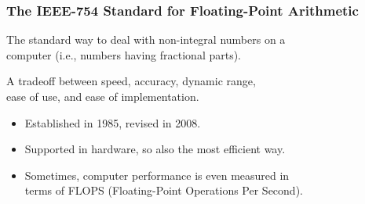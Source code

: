 \begin{frame}

\frametitle{The IEEE-754 Standard for Floating-Point Arithmetic}

\vspace{\fill}

\begin{center}

The standard way to deal with non-integral numbers on a \\ computer (i.e.,
numbers having fractional parts).

\vspace{\fill}

A tradeoff between speed, accuracy, dynamic range, \\ ease of use, and ease of
implementation.

\end{center}

\vspace{\fill}

\begin{itemize}

\item Established in 1985, revised in 2008.

\item Supported in hardware, so also the most efficient way.

\item Sometimes, computer performance is even measured in \\ terms of FLOPS
(Floating-Point Operations Per Second).

\end{itemize}

\end{frame}


